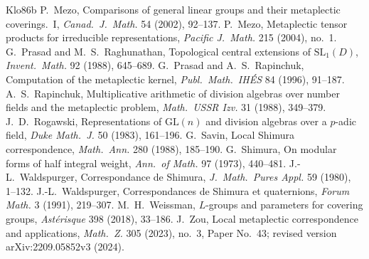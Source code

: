 \documentclass[12pt]{article}
\newcommand{\GL}{\mathrm{GL}}
\theoremstyle{plain}
\theoremstyle{definition}
\begin{document}
\begin{thebibliography}{Klo86b}
 P.~Mezo, Comparisons of general linear groups and their metaplectic coverings.\ I, \emph{Canad.\ J.\ Math.} 54 (2002), 92--137.
 P.~Mezo, Metaplectic tensor products for irreducible representations, \emph{Pacific J.\ Math.} 215 (2004), no.~1.
 G.~Prasad and M.~S.~Raghunathan, Topological central extensions of $\mathrm{SL}_1(D)$, \emph{Invent.\ Math.} 92 (1988), 645--689.
 G.~Prasad and A.~S.~Rapinchuk, Computation of the metaplectic kernel, \emph{Publ.\ Math.\ IH\'ES} 84 (1996), 91--187.
 A.~S.~Rapinchuk, Multiplicative arithmetic of division algebras over number fields and the metaplectic problem, \emph{Math.\ USSR Izv.} 31 (1988), 349--379.
 J.~D.~Rogawski, Representations of $\GL(n)$ and division algebras over a $p$-adic field, \emph{Duke Math.\ J.} 50 (1983), 161--196.
 G.~Savin, Local Shimura correspondence, \emph{Math.\ Ann.} 280 (1988), 185--190.
 G.~Shimura, On modular forms of half integral weight, \emph{Ann.\ of Math.} 97 (1973), 440--481.
 J.-L.~Waldspurger, Correspondance de Shimura, \emph{J.\ Math.\ Pures Appl.} 59 (1980), 1--132.
 J.-L.~Waldspurger, Correspondances de Shimura et quaternions, \emph{Forum Math.} 3 (1991), 219--307.
 M.~H.~Weissman, $L$-groups and parameters for covering groups, \emph{Ast\'erisque} 398 (2018), 33--186.
 J.~Zou, Local metaplectic correspondence and applications, \emph{Math.\ Z.} 305 (2023), no.~3, Paper No.~43; revised version arXiv:2209.05852v3 (2024).
\end{thebibliography}
\end{document}
